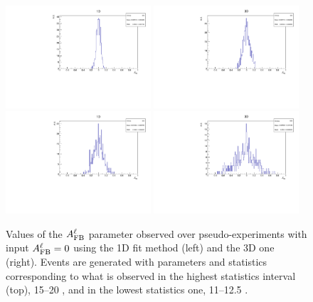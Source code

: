 \begin{figure}[h!]
\centering

\includegraphics[width=0.48\textwidth]{Lmumu/figs/toys3D/B1/1D/toys3D_afb.pdf}
\includegraphics[width=0.48\textwidth]{Lmumu/figs/toys3D/B1/3D/toys3D_afb.pdf}
\includegraphics[width=0.48\textwidth]{Lmumu/figs/toys3D/B2/1D/toys3D_afb.pdf}
\includegraphics[width=0.48\textwidth]{Lmumu/figs/toys3D/B2/3D/toys3D_afb.pdf}
\caption{Values of the $A_{\rm FB}^{\ell}$ parameter observed over pseudo-experiments 
with input $A_{\rm FB}^{\ell} = 0$ using the 1D fit method (left) and the 3D one (right). Events 
are generated with parameters and statistics corresponding to what is observed in the highest 
statistics interval (top), 15--20 \gevgevcccc, and in the lowest statistics one, 11--12.5 \gevgevcccc. }
\label{fig:3DtoyResults}
\end{figure}


